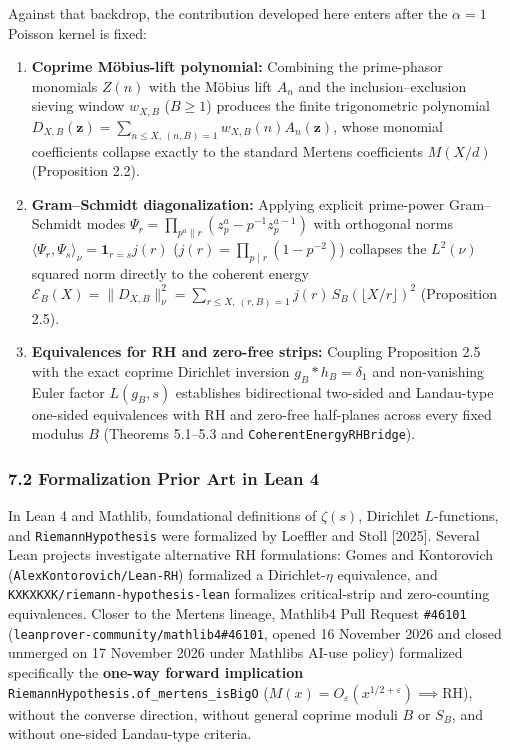 \documentclass[11pt]{article}
\providecommand{\tightlist}{\setlength{\itemsep}{0pt}\setlength{\parskip}{0pt}}
\begin{document}
Against that backdrop, the contribution developed here enters after the \(\alpha = 1\) Poisson kernel is fixed:
\begin{enumerate}
\def\labelenumi{\arabic{enumi}.}
\tightlist
\item
  \textbf{Coprime Möbius-lift polynomial:} Combining the prime-phasor monomials \(Z(n)\) with the Möbius lift \(A_n\) and the inclusion--exclusion sieving window \(w_{X,B}\) (\(B \ge 1\)) produces the finite trigonometric polynomial \(D_{X,B}(\mathbf{z}) = \sum_{n \le X,\, (n,B)=1} w_{X,B}(n) A_n(\mathbf{z})\), whose monomial coefficients collapse exactly to the standard Mertens coefficients \(M(X/d)\) (Proposition 2.2).
\item
  \textbf{Gram--Schmidt diagonalization:} Applying explicit prime-power Gram--Schmidt modes \(\Psi_r = \prod_{p^a \parallel r} (z_p^a - p^{-1} z_p^{a-1})\) with orthogonal norms \(\langle \Psi_r, \Psi_s\rangle_\nu = \mathbf{1}_{r=s} j(r)\) (\(j(r) = \prod_{p \mid r}(1 - p^{-2})\)) collapses the \(L^2(\nu)\) squared norm directly to the coherent energy \(\mathscr{E}_B(X) = \|D_{X,B}\|_\nu^2 = \sum_{r \le X,\, (r,B)=1} j(r)\, S_B(\lfloor X/r\rfloor)^2\) (Proposition 2.5).
\item
  \textbf{Equivalences for RH and zero-free strips:} Coupling Proposition 2.5 with the exact coprime Dirichlet inversion \(g_B * h_B = \delta_1\) and non-vanishing Euler factor \(L(g_B, s)\) establishes bidirectional two-sided and Landau-type one-sided equivalences with \(\mathrm{RH}\) and zero-free half-planes across every fixed modulus \(B\) (Theorems 5.1--5.3 and \texttt{CoherentEnergyRHBridge}).
\end{enumerate}

\subsubsection{7.2 Formalization Prior Art in Lean 4}\label{72-formalization-prior-art-in-lean-4}

In Lean 4 and Mathlib, foundational definitions of \(\zeta(s)\), Dirichlet \(L\)-functions, and \texttt{RiemannHypothesis} were formalized by Loeffler and Stoll {[}2025{]}. Several Lean projects investigate alternative RH formulations: Gomes and Kontorovich (\texttt{AlexKontorovich/Lean-RH}) formalized a Dirichlet-\(\eta\) equivalence, and \texttt{KXKXKXK/riemann-hypothesis-lean} formalizes critical-strip and zero-counting equivalences. Closer to the Mertens lineage, Mathlib4 Pull Request \texttt{\#46101} (\texttt{leanprover-community/mathlib4\#46101}, opened 16 November 2026 and closed unmerged on 17 November 2026 under Mathlib\textquotesingle s AI-use policy) formalized specifically the \textbf{one-way forward implication} \texttt{RiemannHypothesis.of\_mertens\_isBigO} (\(M(x) = O_\varepsilon(x^{1/2+\varepsilon}) \implies \mathrm{RH}\)), without the converse direction, without general coprime moduli \(B\) or \(S_B\), and without one-sided Landau-type criteria.
\end{document}
